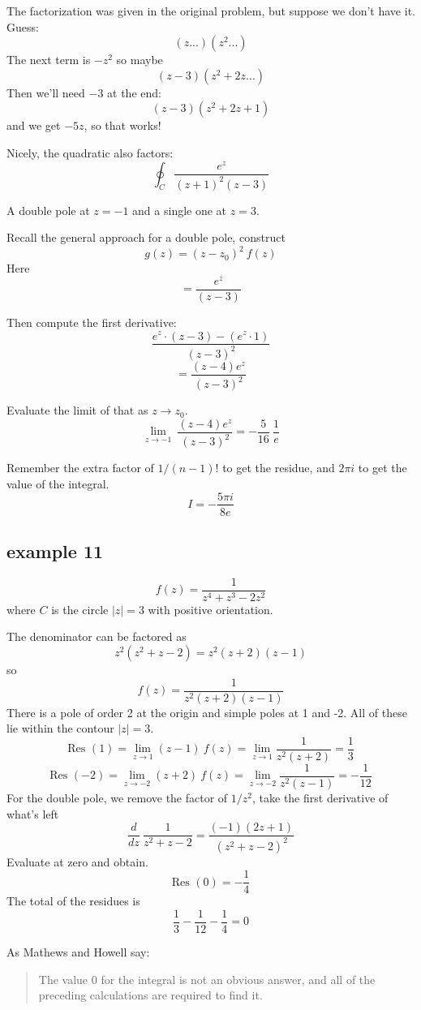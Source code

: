\documentclass[11pt, oneside]{article}
\begin{document}
The factorization was given in the original problem, but suppose we don't have it.  Guess:
\[ (z ...)(z^2 ... ) \]
The next term is $-z^2$ so maybe 
\[ (z -3)(z^2 + 2z ... ) \]
Then we'll need $-3$ at the end:
\[ (z - 3)(z^2 + 2z + 1) \]
and we get $-5z$, so that works!

Nicely, the quadratic also factors:
\[ \oint_C \frac{e^z}{(z+1)^2 (z-3)} \]

A double pole at $z = -1$ and a single one at $z = 3$.

Recall the general approach for a double pole, construct
\[ g(z) = (z - z_0)^2 \ f(z) \]
Here
\[ = \frac{e^z}{(z-3)} \]

Then compute the first derivative:
\[ \frac{e^z \cdot (z-3) - (e^z \cdot 1)}{(z - 3)^2} \]
\[ = \frac{(z-4)e^z}{(z-3)^2} \]

Evaluate the limit of that as $z \rightarrow z_0$.
\[ \lim_{z \rightarrow -1} \ \frac{(z-4)e^z}{(z-3)^2} = -\frac{5}{16} \ \frac{1}{e} \]

Remember the extra factor of $1/(n-1)!$ to get the residue, and $2 \pi i$ to get the value of the integral.
\[ I = -\frac{5 \pi i}{8 e} \]

\subsection*{example  11}

\label{sec:ex11R}

\[ f(z) = \frac{1}{z^4 + z^3 - 2z^2} \]
where $C$ is the circle $|z| = 3$ with positive orientation.

The denominator can be factored as
\[ z^2(z^2 + z - 2) = z^2(z + 2)(z - 1) \]
so
\[ f(z) = \frac{1}{z^2(z + 2)(z - 1)} \]
There is a pole of order 2 at the origin and simple poles at 1 and -2.  All of these lie within the contour $|z| = 3$.
\[ \text{Res }(1) = \lim_{z \rightarrow 1} (z-1) \ f(z) = \lim_{z \rightarrow 1} \frac{1}{z^2 (z + 2)} = \frac{1}{3} \]
\[ \text{Res }(-2) = \lim_{z \rightarrow -2} (z+2) \ f(z) = \lim_{z \rightarrow -2} \frac{1}{z^2 (z - 1)} = -\frac{1}{12} \]
For the double pole, we remove the factor of $1/z^2$, take the first derivative of what's left
\[ \frac{d}{dz} \ \frac{1}{z^2 + z - 2} = \frac{(-1)(2z + 1)}{(z^2 + z - 2)^2} \]
Evaluate at zero and obtain.
\[ \text{Res }(0) = - \frac{1}{4} \]
The total of the residues is
\[ \frac{1}{3} -\frac{1}{12} - \frac{1}{4} = 0 \]

As Mathews and Howell say:
\begin{quote}The value 0 for the integral is not an obvious answer, and all of the preceding calculations are required to find it.\end{quote}
\end{document}
